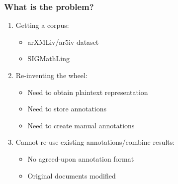\documentclass[aspectratio=169]{beamer}
\begin{document}
\begin{frame}
    \frametitle{What is the problem?}
    \begin{enumerate}
        \item Getting a corpus:
            \begin{itemize}
                \item arXMLiv/ar5iv dataset
                \item SIGMathLing
            \end{itemize}
        \item Re-inventing the wheel:
            \begin{itemize}
                \item Need to obtain plaintext representation
                \item Need to store annotations
                \item Need to create manual annotations
            \end{itemize}
        \item Cannot re-use existing annotations/combine results:
            \begin{itemize}
                \item No agreed-upon annotation format
                \item Original documents modified
            \end{itemize}
    \end{enumerate}
\end{frame}
\end{document}
